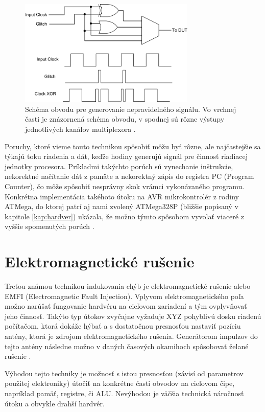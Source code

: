 \begin{figure}
    \centerline{\includegraphics[width=0.75\textwidth]{images/clock.png}}
    \caption[Schéma obvodu pre generovanie nepravidelného signálu.]{Schéma obvodu pre generovanie nepravidelného signálu. Vo vrchnej časti je znázornená schéma obvodu, v spodnej sú rôzne výstupy jednotlivých kanálov multiplexora \cite{clockCircuit}.}
    \label{obr:clock}
\end{figure}

Poruchy, ktoré vieme touto technikou spôsobiť môžu byť rôzne, ale najčastejšie sa týkajú toku riadenia a dát, keďže hodiny generujú signál pre činnosť riadiacej jednotky procesora. Príkladmi takýchto porúch sú vynechanie inštrukcie, nekorektné načítanie dát z pamäte a nekorektný zápis do registra PC (Program Counter), čo môže spôsobiť nesprávny skok vrámci vykonávaného programu. Konkrétna implementácia takéhoto útoku na AVR mikrokontrolér z rodiny ATMega, do ktorej patrí aj nami zvolený ATMega328P (bližšie popísaný v kapitole \ref{kap:hardver}) ukázala, že možno týmto spôsobom vyvolať viaceré z vyššie spomenutých porúch \cite{clock}.

\section{Elektromagnetické rušenie}
Treťou známou technikou indukovania chýb je elektromagnetické rušenie alebo EMFI (Electromagnetic Fault Injection). Vplyvom elektromagnetického poľa možno narúšať fungovanie hardvéru na cieľovom zariadení a tým ovplyvňovať jeho činnosť. Takýto typ útokov zvyčajne vyžaduje XYZ pohyblivú dosku riadenú počítačom, ktorá dokáže hýbať a s dostatočnou presnosťou nastaviť pozíciu antény, ktorá je zdrojom elektromagnetického rušenia. Generátorom impulzov do tejto antény následne možno v daných časových okamihoch spôsobovať želané rušenie \cite{emfi}.

Výhodou tejto techniky je možnosť s istou presnosťou (závisí od parametrov použitej elektroniky) útočiť na konkrétne časti obvodov na cieľovom čipe, napríklad pamäť, registre, či ALU. Nevýhodou je väčšia technická náročnosť útoku a obvykle drahší hardvér.

